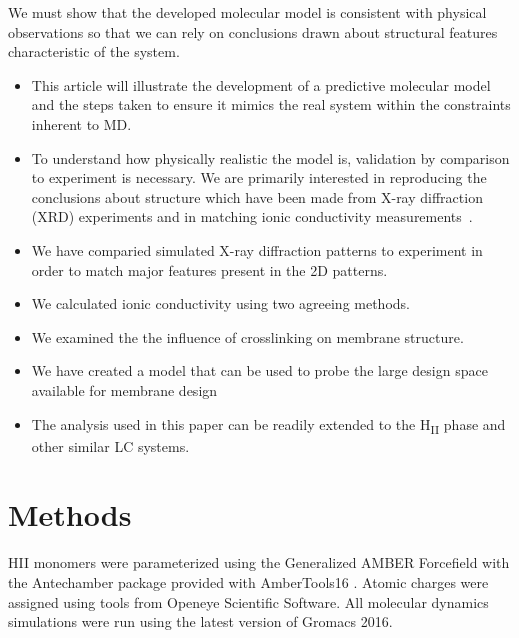 \documentclass{article}
\begin{document}
  We must show that the developed molecular model is consistent with
  physical observations so that we can rely on conclusions drawn about %
  structural features characteristic of the system.
  \begin{itemize}
    \item This article will illustrate the development of a predictive molecular model 
    and the steps taken to ensure it mimics the real system within the constraints 
    inherent to MD.
    \item To understand how physically realistic the model is, validation by comparison
    to experiment is necessary. We are primarily interested in reproducing the 
    conclusions about structure which have been made from X-ray diffraction (XRD) 
    experiments and in matching ionic conductivity measurements~\cite{feng_thin_2016}.
    \item We have comparied simulated X-ray diffraction patterns to experiment in 
    order to match major features present in the 2D patterns.
    \item We calculated ionic conductivity using two agreeing methods.
    \item We examined the the influence of crosslinking on membrane structure.
    \item We have created a model that can be used to probe the large design space
    available for membrane design
    \item The analysis used in this paper can be readily extended to the H\textsubscript{II}
    phase and other similar LC systems.
  \end{itemize}
  
  \section*{Methods}
  
  HII monomers were parameterized using the Generalized AMBER Forcefield
  \cite{wang_development_2004} with the Antechamber package \cite{wang_automatic_2006}
  provided with AmberTools16 \cite{case_ambertools16_2016}. Atomic charges were
  assigned using tools from Openeye Scientific Software. All molecular dynamics 
  simulations were run using the latest version of Gromacs 2016. 
  \cite{bekker_gromacs:_1993,berendsen_gromacs:_1995,van_der_spoel_gromacs:_2005,hess_gromacs_2008}
  
\end{document}
